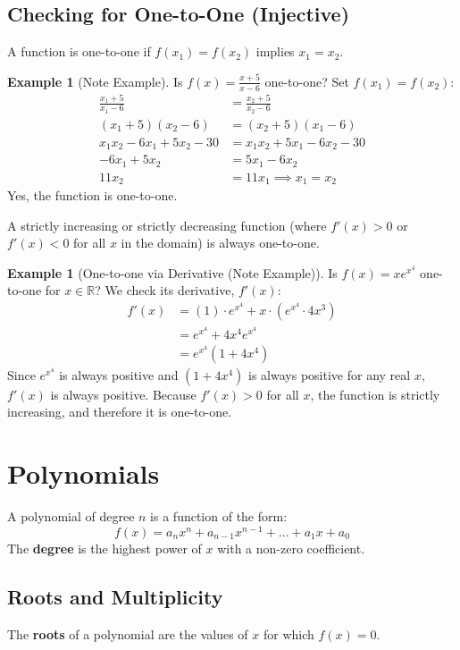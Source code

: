 \documentclass[11pt, a4paper]{article}
\theoremstyle{definition}
\newtheorem{example}[theorem]{Example}
\begin{document}
\subsection{Checking for One-to-One (Injective)}
A function is one-to-one if $f(x_1) = f(x_2)$ implies $x_1 = x_2$.

\begin{example}[Note Example]
Is $f(x) = \frac{x+5}{x-6}$ one-to-one?
Set $f(x_1) = f(x_2)$:
\begin{align*}
    \frac{x_1+5}{x_1-6} &= \frac{x_2+5}{x_2-6} \\
    (x_1+5)(x_2-6) &= (x_2+5)(x_1-6) \\
    x_1x_2 - 6x_1 + 5x_2 - 30 &= x_1x_2 + 5x_1 - 6x_2 - 30 \\
    -6x_1 + 5x_2 &= 5x_1 - 6x_2 \\
    11x_2 &= 11x_1 \implies x_1 = x_2
\end{align*}
Yes, the function is one-to-one.
\end{example}

A strictly increasing or strictly decreasing function (where $f'(x) > 0$ or $f'(x) < 0$ for all $x$ in the domain) is always one-to-one.

\begin{example}[One-to-one via Derivative (Note Example)]
Is $f(x) = xe^{x^4}$ one-to-one for $x \in \mathbb{R}$?
We check its derivative, $f'(x)$:
\begin{align*}
    f'(x) &= (1) \cdot e^{x^4} + x \cdot (e^{x^4} \cdot 4x^3) \\
    &= e^{x^4} + 4x^4 e^{x^4} \\
    &= e^{x^4} (1 + 4x^4)
\end{align*}
Since $e^{x^4}$ is always positive and $(1 + 4x^4)$ is always positive for any real $x$, $f'(x)$ is always positive.
Because $f'(x) > 0$ for all $x$, the function is strictly increasing, and therefore it is one-to-one.
\end{example}

\section{Polynomials}
A polynomial of degree $n$ is a function of the form:
\[
f(x) = a_n x^n + a_{n-1} x^{n-1} + \dots + a_1 x + a_0
\]
The \textbf{degree} is the highest power of $x$ with a non-zero coefficient.

\subsection{Roots and Multiplicity}
The \textbf{roots} of a polynomial are the values of $x$ for which $f(x) = 0$.
\end{document}
